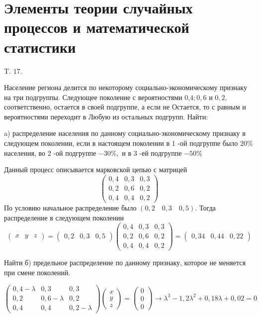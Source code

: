 \documentclass[a4paper,12pt]{article} %
\begin{document}
\section{Элементы теории случайных процессов и математической статистики}




\begin{example} T. $17 .$ 

Население региона делится по некоторому социально-экономическому признаку на три подгруппы. Следующее поколение с вероятностями 0,$4 ; 0,6$ и $0,2,$ соответственно, остается в своей подгруппе, а если не
Остается, то с равным и вероятностями переходит в Любую из остальных подгрупп. Найти:

a) распределение населения по данному социально-экономическому 
признаку в следующем поколении, если в настоящем поколении в 1 -ой подгруппе было $20 \%$ населения, во 2 -ой подгруппе $-30 \%,$ и в 3 -ей подгруппе $-50 \%$




Данный процесс описывается марковской цепью с матрицей
$$
\left(\begin{array}{lll}
0,4 & 0,3 & 0,3 \\
0,2 & 0,6 & 0,2 \\
0,4 & 0,4 & 0,2
\end{array}\right)
$$
По условию начальное распределение было $(0,2 \quad 0,3 \quad 0,5)$. Тогда распределение в следующем поколении
$$
\left(\begin{array}{lllll}
x & y & z
\end{array}\right)=\left(\begin{array}{lll}
0,2 & 0,3 & 0,5
\end{array}\right)\left(\begin{array}{lll}
0,4 & 0,3 & 0,3 \\
0,2 & 0,6 & 0,2 \\
0,4 & 0,4 & 0,2
\end{array}\right)=\left(\begin{array}{lll}
0,34 & 0,44 & 0,22
\end{array}\right)
$$



Найти б) предельное распределение по данному признаку, которое не меняется при смене поколений.





$$
\left(\begin{array}{ccc}
0,4-\lambda & 0,3 & 0,3 \\
0,2 & 0,6-\lambda & 0,2 \\
0,4 & 0,4 & 0,2-\lambda
\end{array}\right)\left(\begin{array}{l}
x \\
y \\
z
\end{array}\right)=\left(\begin{array}{l}
0 \\
0 \\
0
\end{array}\right) \rightarrow \lambda^{3}-1,2 \lambda^{2}+0,18 \lambda+0,02=0
$$




\end{example}
\end{document}
